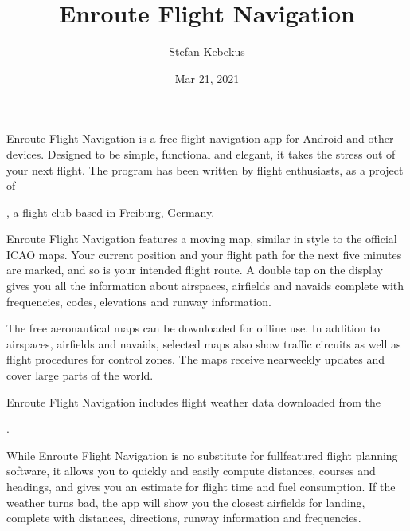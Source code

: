 \documentclass[letterpaper,10pt,english]{sphinxmanual}
\title{Enroute Flight Navigation}
\date{Mar 21, 2021}
\author{Stefan Kebekus}
\let\sphinxpxdimen\pdfpxdimen\else\newdimen\sphinxpxdimen
\begin{document}
\pagestyle{empty}
\sphinxmaketitle
\pagestyle{plain}
\sphinxtableofcontents
\pagestyle{normal}
\label{\detokenize{index::doc}}


\noindent{\hspace*{\fill}\sphinxincludegraphics[width=100\sphinxpxdimen]{{de.akaflieg_freiburg.enroute}.png}\hspace*{\fill}}

\sphinxAtStartPar
Enroute Flight Navigation is a free flight navigation app for Android and other
devices. Designed to be simple, functional and elegant, it takes the stress out
of your next flight. The program has been written by flight enthusiasts, as a
project of %
\begin{footnote}[1]\sphinxAtStartFootnote
{}
%
\end{footnote}, a flight club
based in Freiburg, Germany.

\sphinxAtStartPar
Enroute Flight Navigation features a moving map, similar in style to the
official ICAO maps. Your current position and your flight path for the next five
minutes are marked, and so is your intended flight route. A double tap on the
display gives you all the information about airspaces, airfields and navaids \textendash{}
complete with frequencies, codes, elevations and runway information.

\sphinxAtStartPar
The free aeronautical maps can be downloaded for offline use. In addition to
airspaces, airfields and navaids, selected maps also show traffic circuits as
well as flight procedures for control zones. The maps receive near\sphinxhyphen{}weekly
updates and cover large parts of the world.

\sphinxAtStartPar
Enroute Flight Navigation includes flight weather data downloaded from the
%
\begin{footnote}[2]\sphinxAtStartFootnote
{}
%
\end{footnote}.

\sphinxAtStartPar
While Enroute Flight Navigation is no substitute for full\sphinxhyphen{}featured flight
planning software, it allows you to quickly and easily compute distances,
courses and headings, and gives you an estimate for flight time and fuel
consumption. If the weather turns bad, the app will show you the closest
airfields for landing, complete with distances, directions, runway information
and frequencies.
\end{document}
